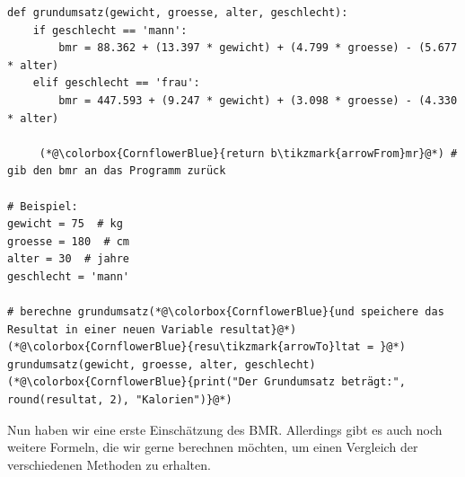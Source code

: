 \begin{minipage}{\linewidth}
\begin{lstlisting}
def grundumsatz(gewicht, groesse, alter, geschlecht):
    if geschlecht == 'mann':
        bmr = 88.362 + (13.397 * gewicht) + (4.799 * groesse) - (5.677 * alter)
    elif geschlecht == 'frau':
        bmr = 447.593 + (9.247 * gewicht) + (3.098 * groesse) - (4.330 * alter)
    
     (*@\colorbox{CornflowerBlue}{return b\tikzmark{arrowFrom}mr}@*) # gib den bmr an das Programm zurück

# Beispiel:
gewicht = 75  # kg
groesse = 180  # cm
alter = 30  # jahre
geschlecht = 'mann'

# berechne grundumsatz(*@\colorbox{CornflowerBlue}{und speichere das Resultat in einer neuen Variable resultat}@*)
(*@\colorbox{CornflowerBlue}{resu\tikzmark{arrowTo}ltat = }@*) grundumsatz(gewicht, groesse, alter, geschlecht)
(*@\colorbox{CornflowerBlue}{print("Der Grundumsatz beträgt:", round(resultat, 2), "Kalorien")}@*)
\end{lstlisting}
\end{minipage}


Nun haben wir eine erste Einschätzung des \gls{BMR}. Allerdings gibt es auch noch weitere Formeln, die wir gerne berechnen möchten, um einen Vergleich der verschiedenen Methoden zu erhalten.

